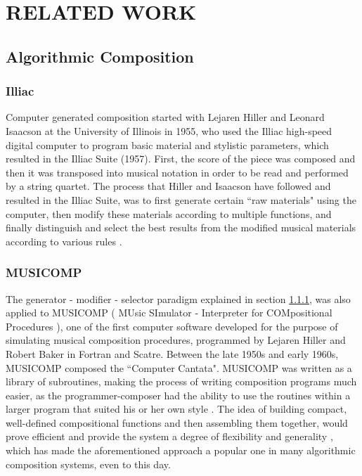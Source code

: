 \chapter{RELATED WORK} \label{chapter:related_work}

    \section{Algorithmic Composition} 

    \subsection{Illiac} \label{subsec:illiac}
    Computer generated composition started with Lejaren Hiller and Leonard Isaacson at the University of Illinois in 1955, who used the Illiac high-speed digital computer to program basic material and stylistic parameters, which resulted in the Illiac Suite (1957). First, the score of the piece was composed and then it was transposed into musical notation in order to be read and performed by a string quartet. The process that Hiller and Isaacson have followed and resulted in the Illiac Suite, was to first generate certain ``raw materials" using the computer, then modify these materials according to multiple functions, and finally distinguish and select the best results from the modified musical materials according to various rules \cite{Alpern1995TechniquesFA}. 

    \subsection{MUSICOMP} \label{subsec:musicomp}
    The generator - modifier - selector paradigm explained in section \ref{subsec:illiac}, was also applied to MUSICOMP ( MUsic SImulator - Interpreter for COMpositional Procedures ), one of the first computer software developed for the purpose of simulating musical composition procedures, programmed by Lejaren Hiller and Robert Baker in Fortran and Scatre. Between the late 1950s and early 1960s, MUSICOMP composed the ``Computer Cantata". MUSICOMP was written as a library of subroutines, making the process of writing composition programs much easier, as the programmer-composer had the ability to use the routines within a larger program that suited his or her own style \cite{Alpern1995TechniquesFA}. The idea of building compact, well-defined compositional functions and then assembling them together, would prove efficient and provide the system a degree of flexibility and generality \cite{Alpern1995TechniquesFA}, which has made the aforementioned approach a popular one in many algorithmic composition systems, even to this day.


